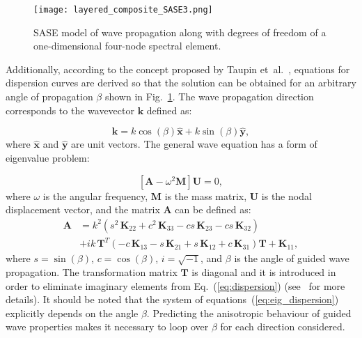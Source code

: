 \documentclass[preprint,12pt]{elsarticle}
\newcommand{\matr}[1]{\mathbf{#1}} %
\newcommand{\vect}[1]{\mathbf{#1}} %
\begin{document}
\begin{figure} [h!]
	\centering
	\texttt{[image: layered\_composite\_SASE3.png]}
	\caption{SASE model of wave propagation along with degrees of freedom of a one-dimensional four-node spectral element.}
	\label{fig:layered_composite_SASE}
\end{figure}
	
Additionally, according to the concept proposed by Taupin et~al.~\cite{Taupin2011}, equations for dispersion curves are derived so that the solution can be obtained for an arbitrary angle of propagation $\beta$ shown in Fig.~\ref{fig:layered_composite_SASE}. 
The wave propagation direction corresponds to the wavevector $\vect{k}$ defined as:
	
\begin{equation}
	\vect{k} = k \cos (\beta)\hat{ \vect{x}} + k \sin (\beta) \hat{\vect{y}},
	\label{eq:wavevector}
\end{equation}
where \(\hat{ \vect{x}}\) and \(\hat{\vect{y}}\) are unit vectors. 	
The general wave equation has a form of eigenvalue problem:

\begin{equation}
	\left[\matr{A} - \omega^2\matr{M} \right] \vect{U} =0,
	\label{eq:eig_dispersion}
\end{equation}
where $\omega$ is the angular frequency, $\matr{M}$ is the mass matrix, $\matr{U}$ is the nodal displacement vector, and the matrix $\matr{A}$ can be defined as:
\begin{equation}
	\begin{aligned}
	\matr{A} & =  k^2\left(s^2 \,\matr{K}_{22} + c^2\, \matr{K}_{33} - c s\, \matr{K}_{23} - c s\, \matr{K}_{32}\right) \\
	& + i k\, \matr{T}^T\left(-c\, \matr{K}_{13} - s\, \matr{K}_{21} + s\, \matr{K}_{12} + c\, \matr{K}_{31}\right) \matr{T} +\matr{K}_{11},
	\end{aligned}
	\label{eq:dispersion}
\end{equation}
where  $s = \sin(\beta)$, $c = \cos(\beta)$, $i = \sqrt{-1}$, and $\beta$ is the angle of guided wave propagation. 
The transformation matrix $\matr{T}$ is diagonal and it is introduced in order to eliminate imaginary elements from Eq.~(\ref{eq:dispersion}) (see~\cite{Bartoli2006} for more details). 
It should be noted that the system of equations~(\ref{eq:eig_dispersion}) explicitly depends on the angle $\beta$. 
Predicting the anisotropic behaviour of guided wave properties makes it necessary to loop over $\beta$ for each direction considered.
	
\end{document}
